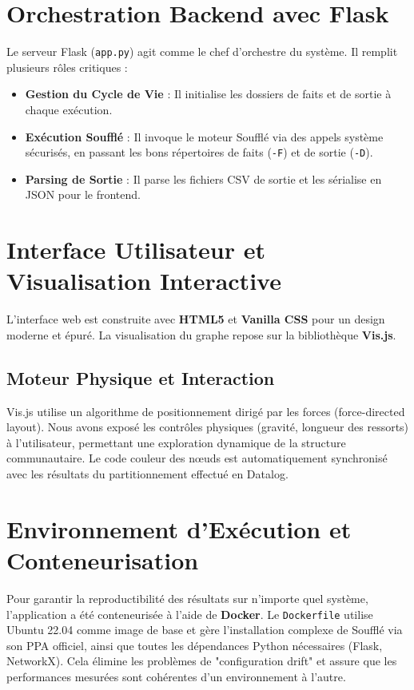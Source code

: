 \documentclass[12pt,a4paper]{report}
\begin{document}
\section{Orchestration Backend avec Flask}
Le serveur Flask (\texttt{app.py}) agit comme le chef d'orchestre du système. Il remplit plusieurs rôles critiques :
\begin{itemize}
    \item \textbf{Gestion du Cycle de Vie} : Il initialise les dossiers de faits et de sortie à chaque exécution.
    \item \textbf{Exécution Soufflé} : Il invoque le moteur Soufflé via des appels système sécurisés, en passant les bons répertoires de faits (\texttt{-F}) et de sortie (\texttt{-D}).
    \item \textbf{Parsing de Sortie} : Il parse les fichiers CSV de sortie et les sérialise en JSON pour le frontend.
\end{itemize}

\section{Interface Utilisateur et Visualisation Interactive}
L'interface web est construite avec \textbf{HTML5} et \textbf{Vanilla CSS} pour un design moderne et épuré. La visualisation du graphe repose sur la bibliothèque \textbf{Vis.js}.
\subsection{Moteur Physique et Interaction}
Vis.js utilise un algorithme de positionnement dirigé par les forces (force-directed layout). Nous avons exposé les contrôles physiques (gravité, longueur des ressorts) à l'utilisateur, permettant une exploration dynamique de la structure communautaire. Le code couleur des nœuds est automatiquement synchronisé avec les résultats du partitionnement effectué en Datalog.

\section{Environnement d'Exécution et Conteneurisation}
Pour garantir la reproductibilité des résultats sur n'importe quel système, l'application a été conteneurisée à l'aide de \textbf{Docker}. Le \texttt{Dockerfile} utilise Ubuntu 22.04 comme image de base et gère l'installation complexe de Soufflé via son PPA officiel, ainsi que toutes les dépendances Python nécessaires (Flask, NetworkX). Cela élimine les problèmes de "configuration drift" et assure que les performances mesurées sont cohérentes d'un environnement à l'autre.
\end{document}
